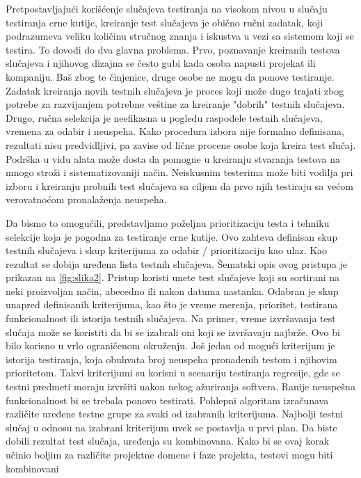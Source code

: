 \documentclass[a4paper]{article}
\begin{document}
Pretpostavljajući korišćenje slučajeva testiranja na visokom nivou u slučaju testiranja crne kutije, kreiranje test slučajeva je obično ručni zadatak, koji podrazumeva veliku količinu stručnog znanja i iskustva u vezi sa sistemom koji se testira. To dovodi do dva glavna problema. Prvo, poznavanje kreiranih testova slučajeva i njihovog dizajna se često gubi kada osoba napusti projekat ili kompaniju. Baš zbog te činjenice, druge osobe ne mogu da ponove testiranje. Zadatak kreiranja novih testnih slučajeva je proces koji može dugo trajati zbog potrebe za razvijanjem potrebne veštine za kreiranje "dobrih" testnih slučajeva. Drugo, ručna selekcija je neefikasna u pogledu raspodele testnih slučajeva, vremena za odabir i neuspeha. Kako procedura izbora nije formalno definisana, rezultati nisu predvidljivi, pa zavise od lične procene osobe koja kreira test slučaj. Podrška u vidu alata može dosta da pomogne u kreiranju stvaranja testova na mnogo stroži i sistematizovaniji način. Neiskusnim testerima može biti vodilja pri izboru i kreiranju probnih test slučajeva sa ciljem da prvo njih testiraju sa većom verovatnoćom pronalaženja neuspeha.
\bigbreak

Da bismo to omogućili, predstavljamo poželjnu prioritizaciju testa i tehniku selekcije koja je pogodna za testiranje crne kutije. Ovo zahteva definisan skup testnih slučajeva i skup kriterijuma za odabir / prioritizaciju kao ulaz. Kao rezultat se dobija uređena lista testnih slučajeva. Šematski opis ovog pristupa je prikazan na \ref{fig:slika2}. Pristup koristi unete test slučajeve koji su sortirani na neki proizvoljan način, abecedno ili nakon datuma nastanka. Odabran je skup unapred definisanih kriterijuma, kao što je vreme merenja, prioritet, testirana funkcionalnost ili istorija testnih slučajeva. Na primer, vreme izvršavanja test slučaja može se koristiti da bi se izabrali oni koji se izvršavaju najbrže. Ovo bi bilo korisno u vrlo ograničenom okruženju. Još jedan od mogući kriterijum je istorija testiranja, koja obuhvata broj neuspeha pronađenih testom i njihovim prioritetom. Takvi kriterijumi su korisni u scenariju testiranja regresije, gde se testni predmeti moraju izvršiti nakon nekog ažuriranja softvera. Ranije neuspešna funkcionalnost bi se trebala ponovo testirati.  Pohlepni algoritam izračunava različite uređene testne grupe za svaki od izabranih kriterijuma. Najbolji testni slučaj u odnosu na izabrani kriterijum uvek se postavlja u prvi plan. Da biste dobili rezultat test slučaja, uređenja su kombinovana. Kako bi se ovaj korak učinio boljim za različite projektne domene i faze projekta, testovi mogu biti kombinovani
\bigbreak
\end{document}
